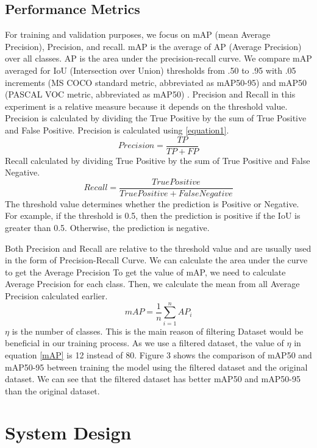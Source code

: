 \documentclass[conference]{IEEEtran}
\begin{document}
\subsection{Performance Metrics}
For training and validation purposes, we focus on mAP (mean Average Precision), Precision, and recall. mAP is the average of AP (Average Precision) over all classes. AP is the area under the precision-recall curve.
We compare mAP averaged for IoU (Intersection over Union) thresholds from .50 to .95 with .05 increments (MS COCO standard metric, abbreviated as mAP50-95) and mAP50 (PASCAL VOC metric, abbreviated as mAP50) \cite{COCO Dataset}. 
Precision and Recall in  this experiment is a relative measure because it depends on the threshold value.
Precision is calculated by dividing the True Positive by the sum of True Positive and False Positive. 
Precision is calculated using \eqref{equation1}.
\begin{equation}
Precision = \frac{TP}{TP+FP}
\label{equation1}
\end{equation}
Recall calculated by dividing True Positive by the sum of True Positive and False Negative.
\begin{equation}
Recall = \frac{True Positive}{TruePositive+FalseNegative}
\end{equation}
The threshold value determines whether the prediction is Positive or Negative. For example, if the threshold is 0.5, then the prediction is positive if the IoU is greater than 0.5. Otherwise, the prediction is negative.

Both Precision and Recall are relative to the threshold value and are usually used in the form of Precision-Recall Curve. We can calculate the area under the curve to get the Average Precision
To get the value of mAP, we need to calculate Average Precision for each class. Then, we calculate the mean from all Average Precision calculated earlier.
\begin{equation}
mAP = \frac{1}{n}\sum_{i=1}^{n}AP_i
\label{mAP}
\end{equation}
$\eta$ is the number of classes.
This is the main reason of filtering Dataset would be beneficial in our training process. As we use a filtered dataset, the value of $\eta$ in equation \ref{mAP} is 12 instead of 80.
Figure 3 shows the comparison of mAP50 and mAP50-95 between training the model using the filtered dataset and  the original dataset. We can see that the filtered dataset has better mAP50 and mAP50-95 than the original dataset.
\

\section{System Design}
\end{document}
